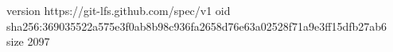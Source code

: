 version https://git-lfs.github.com/spec/v1
oid sha256:369035522a575e3f0ab8b98c936fa2658d76e63a02528f71a9e3ff15dfb27ab6
size 2097
